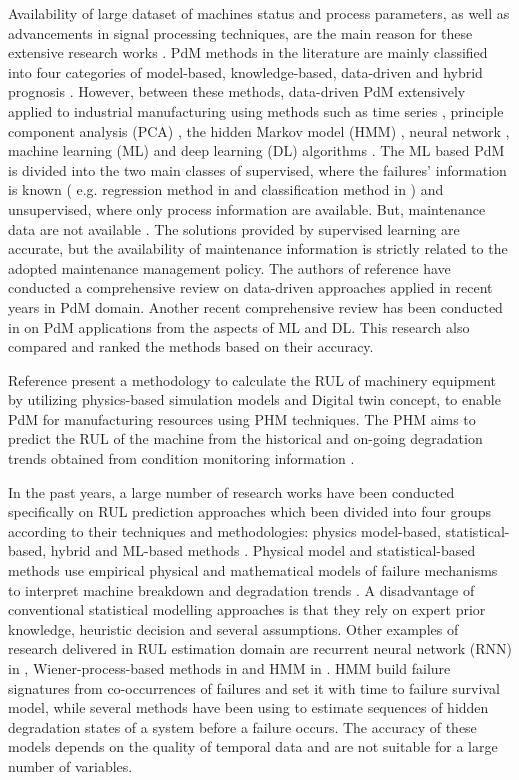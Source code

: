 \documentclass[conference]{IEEEtran}
\begin{document}
Availability of large dataset of machines status and process parameters, as well as advancements in signal processing techniques, are the main reason for these extensive research works \cite{Susto2015}. PdM methods in the literature are mainly classified into four categories of model-based, knowledge-based, data-driven and hybrid prognosis \cite{Liao2014}. However, between these methods, data-driven PdM extensively applied to industrial manufacturing using methods such as time series \cite{Lin2019}, principle component analysis (PCA) \cite{You2015}, the hidden Markov model (HMM) \cite{Vrignat2015}, neural network \cite{Malhi2011}, machine learning (ML) \cite{Jiang2018,Carvalho2019} and deep learning (DL) algorithms \cite{Zhao2019,Namuduri2020,Li2019a}. The ML based PdM is divided into the two main classes of supervised, where the failures' information is known ( e.g. regression method in \cite{Kumar2019} and classiﬁcation method in \cite{Canizo2017}) and unsupervised, where only process information are available. But, maintenance data are not available \cite{Jiang2018}. The solutions provided by supervised learning are accurate, but the availability of maintenance information is strictly related to the adopted maintenance management policy. The authors of reference \cite{Lei2018} have conducted a comprehensive review on data-driven approaches applied in recent years in PdM domain. Another recent comprehensive review has been conducted in \cite{Zhang2019} on PdM applications from the aspects of ML and DL. This research also compared and ranked the methods based on their accuracy.

Reference \cite{Aivaliotis2019} present a methodology to calculate the RUL of machinery equipment by utilizing physics-based simulation models and Digital twin concept, to enable PdM for manufacturing resources using PHM techniques. The PHM aims to predict the RUL of the machine from the historical and on-going degradation trends obtained from condition monitoring information \cite{Li2020}.

In the past years, a large number of research works have been conducted specifically on RUL prediction approaches which been divided into four groups according to their techniques and methodologies: physics model-based, statistical-based, hybrid and ML-based methods \cite{Jiang2018,Lei2018,Aivaliotis2019,Li2020}. Physical model and statistical-based methods use empirical physical and mathematical models of failure mechanisms to interpret machine breakdown and degradation trends \cite{Cai2020,Zhang2020,Ahmad2019}. A disadvantage of conventional statistical modelling approaches is that they rely on expert prior knowledge, heuristic decision and several assumptions. Other examples of research delivered in RUL estimation domain are recurrent neural network (RNN) in \cite{Guo2017}, Wiener-process-based methods in \cite{Zhang2018} and HMM in \cite{Vrignat2015,Chen2019}. HMM build failure signatures from co-occurrences of failures and set it with time to failure survival model, while several methods have been using to estimate sequences of hidden degradation states of a system before a failure occurs. The accuracy of these models depends on the quality of temporal data and are not suitable for a large number of variables.
\end{document}
